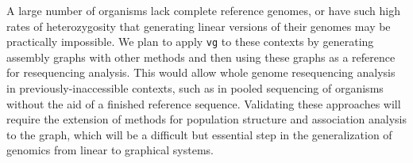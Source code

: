 \documentclass{article}
\begin{document}
A large number of organisms lack complete reference genomes, or have such high rates of heterozygosity that generating linear versions of their genomes may be practically impossible.
We plan to apply {\tt vg} to these contexts by generating assembly graphs with other methods and then using these graphs as a reference for resequencing analysis.
This would allow whole genome resequencing analysis in previously-inaccessible contexts, such as in pooled sequencing of organisms without the aid of a finished reference sequence. 
Validating these approaches will require the extension of methods for population structure and association analysis to the graph, which will be a difficult but essential step in the generalization of genomics from linear to graphical systems.

{}


\end{document}

